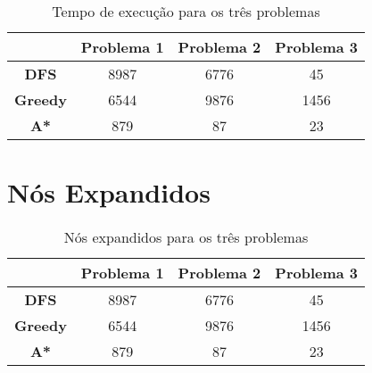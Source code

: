 \documentclass[12pt,a4paper]{article}
\begin{document}
\begin{table}[ht]
	\centering
	\begin{tabular}{c|c|c|c}
	\multicolumn{1}{r|}{} & \textbf{Problema 1} & \textbf{Problema 2} & \textbf{Problema 3} \\ \hline
	\textbf{DFS}          & 8987                                                                 & 6776                                                               & 45                                                             \\ \hline
	\textbf{Greedy}       & 6544                                                                 & 9876                                                               & 1456                                                           \\ \hline
	\textbf{A*}           & 879                                                                  & 87                                                                 & 23                                                            
	\end{tabular}
	\caption{Tempo de execução para os três problemas}
	\label{te}
\end{table}

\section{Nós Expandidos}

\begin{table}[ht]
	\centering
	\begin{tabular}{c|c|c|c}
	\multicolumn{1}{r|}{} & \textbf{Problema 1} & \textbf{Problema 2} & \textbf{Problema 3} \\ \hline
	\textbf{DFS}          & 8987                                                                 & 6776                                                               & 45                                                             \\ \hline
	\textbf{Greedy}       & 6544                                                                 & 9876                                                               & 1456                                                           \\ \hline
	\textbf{A*}           & 879                                                                  & 87                                                                 & 23                                                            
	\end{tabular}
	\caption{Nós expandidos para os três problemas}
	\label{ne}
\end{table}
\end{document}
